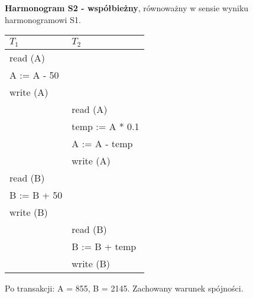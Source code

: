 \documentclass[main.tex]{subfiles}
\begin{document}
    \noindent \textbf{Harmonogram S2 - współbieżny}, równoważny w sensie wyniku harmonogramowi S1.
    \begin{table}[H]
        \begin{center}
            \begin{tabular}{| p{6cm} | p{6cm} |}
                \hline
                $T_1$ & $T_2$\\
                \hline
                \hline
                read (A) &\\
                \hline
                A := A - 50 &\\
                \hline
                write (A) &\\
                \hline
                & read (A)\\
                \hline
                & temp := A * 0.1\\
                \hline
                & A := A - temp\\
                \hline
                & write (A)\\
                \hline
                read (B) &\\
                \hline
                B := B + 50 &\\
                \hline
                write (B) &\\
                \hline
                & read (B)\\
                \hline
                & B := B + temp\\
                \hline
                & write (B)\\
                \hline
            \end{tabular}
        \end{center}
    \end{table}

    Po transakcji: A = 855, B = 2145. Zachowany warunek spójności.\\
\end{document}
